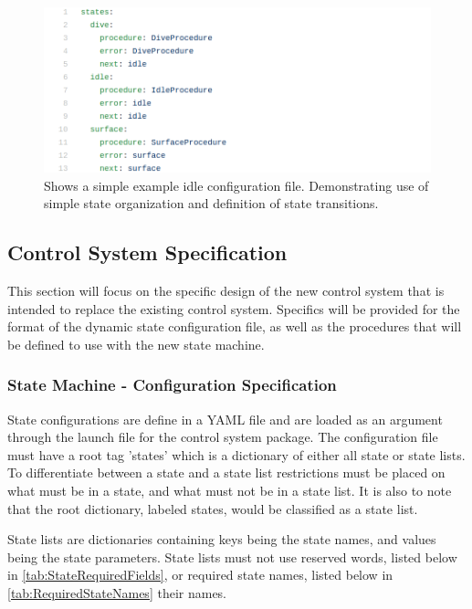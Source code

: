 \begin{figure}[H]
\centering
\includegraphics[width=150mm]{Figures/ExampleConfig}
\decoRule
\caption[Example Configuration File]{Shows a simple example idle configuration file. Demonstrating use of simple state organization and definition of state transitions.}
\label{fig:ExampleConfig}
\end{figure}

\subsection{Control System Specification}

This section will focus on the specific design of the new control system that is
intended to replace the existing control system.
Specifics will be provided for the format of the dynamic state configuration
file, as well as the procedures that will be defined to use with the new state machine.

\subsubsection{State Machine - Configuration Specification}

State configurations are define in a YAML file and are loaded as an argument
through the launch file for the control system package.
The configuration file must have a root tag 'states' which is a dictionary of
either all state or state lists.
To differentiate between a state and a state list restrictions must be placed on
what must be in a state, and what must not be in a state list.
It is also to note that the root dictionary, labeled states, would be classified as a
state list.

State lists are dictionaries containing keys being the state names, and values
being the state parameters.
State lists must not use reserved words, listed below in
\ref{tab:StateRequiredFields}, or required state names, listed below in
\ref{tab:RequiredStateNames} their names.

